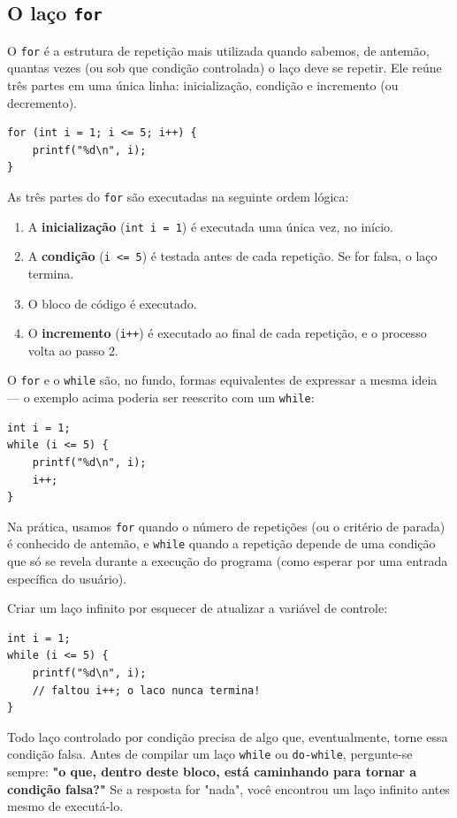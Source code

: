 \documentclass[12pt,a4paper,oneside]{extreport}
\begin{document}
\subsection{O laço \texttt{for}}

O \texttt{for} é a estrutura de repetição mais utilizada quando sabemos, de antemão, quantas vezes (ou sob que condição controlada) o laço deve se repetir. Ele reúne três partes em uma única linha: inicialização, condição e incremento (ou decremento).

\begin{lstlisting}
for (int i = 1; i <= 5; i++) {
    printf("%d\n", i);
}
\end{lstlisting}

As três partes do \texttt{for} são executadas na seguinte ordem lógica:

\begin{enumerate}
    \item A \textbf{inicialização} (\texttt{int i = 1}) é executada uma única vez, no início.
    \item A \textbf{condição} (\texttt{i <= 5}) é testada antes de cada repetição. Se for falsa, o laço termina.
    \item O bloco de código é executado.
    \item O \textbf{incremento} (\texttt{i++}) é executado ao final de cada repetição, e o processo volta ao passo 2.
\end{enumerate}

O \texttt{for} e o \texttt{while} são, no fundo, formas equivalentes de expressar a mesma ideia — o exemplo acima poderia ser reescrito com um \texttt{while}:

\begin{lstlisting}
int i = 1;
while (i <= 5) {
    printf("%d\n", i);
    i++;
}
\end{lstlisting}

Na prática, usamos \texttt{for} quando o número de repetições (ou o critério de parada) é conhecido de antemão, e \texttt{while} quando a repetição depende de uma condição que só se revela durante a execução do programa (como esperar por uma entrada específica do usuário).

\begin{errocomum}
Criar um laço infinito por esquecer de atualizar a variável de controle:
\begin{lstlisting}
int i = 1;
while (i <= 5) {
    printf("%d\n", i);
    // faltou i++; o laco nunca termina!
}
\end{lstlisting}
Todo laço controlado por condição precisa de algo que, eventualmente, torne essa condição falsa. Antes de compilar um laço \texttt{while} ou \texttt{do-while}, pergunte-se sempre: \textbf{"o que, dentro deste bloco, está caminhando para tornar a condição falsa?"} Se a resposta for "nada", você encontrou um laço infinito antes mesmo de executá-lo.
\end{errocomum}
\end{document}
